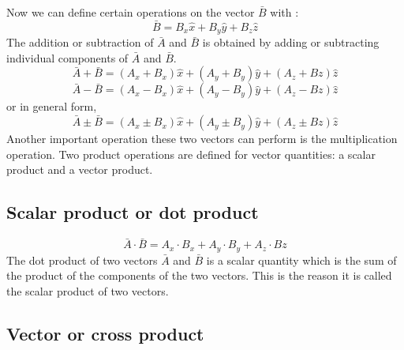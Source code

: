 Now we can define certain operations on the vector $\bar{B}$ with : 
\begin{equation}
\bar{B} = B_{x}\hat{x} + B_{y}\hat{y} + B_{z}\hat{z} 
\end{equation} 
The addition or subtraction of $\bar{A}$ and $\bar{B}$ is obtained by adding or subtracting individual components of $\bar{A}$ and $\bar{B}$.
\begin{equation}
\bar{A} + \bar{B} = (A_{x} + B_{x} )\hat{x} + (A_{y} + B_{y})\hat{y} +(A_{z} + B{z})\hat{z} 
\end{equation}
\begin{equation}
\bar{A} - \bar{B} = (A_{x} - B_{x} )\hat{x} + (A_{y} - B_{y})\hat{y} +(A_{z} - B{z})\hat{z}
\end{equation}
or in general form,
\begin{equation}
\bar{A} \pm \bar{B} = (A_{x} \pm B_{x} )\hat{x} + (A_{y} \pm B_{y})\hat{y} +(A_{z} \pm B{z})\hat{z}
\end{equation}
Another important operation these two vectors can perform is the multiplication operation. Two product operations are defined for vector quantities: a scalar product and a vector product.

\subsection{Scalar product or dot product}
\begin{equation}
\bar{A}\cdot\bar{B} = A_{x}\cdot B_{x} + A_{y}\cdot B_{y} + A_{z}\cdot B{z} 
\end{equation}
The dot product of two vectors $\bar{A}$ and $\bar{B}$ is a scalar quantity which is the sum of the product of the components of the two vectors. This is the reason it is called the scalar product of two vectors.
\subsection{Vector or cross product}

